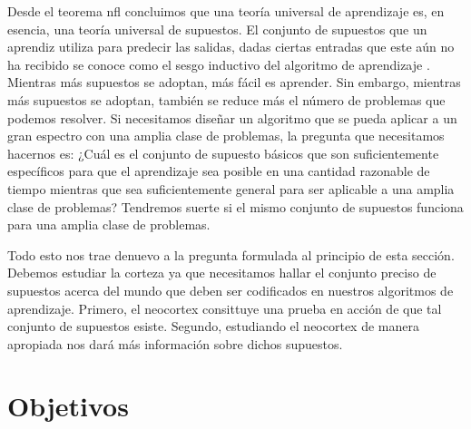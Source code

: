 Desde el teorema \gls{nfl} concluimos que una teoría universal de aprendizaje es,
en esencia, una teoría universal de supuestos.
El conjunto de supuestos que un aprendiz utiliza para predecir las salidas, dadas ciertas entradas
que este aún no ha recibido se conoce como el sesgo inductivo del algoritmo de aprendizaje \cite{Mitchell80theneed,10.1007/BF00993472}.
Mientras más supuestos se adoptan, más fácil es aprender.
Sin embargo, mientras más supuestos se adoptan, también se reduce más el número de problemas que podemos resolver.
Si necesitamos diseñar un algoritmo que se pueda aplicar a un gran espectro con una amplia clase de problemas,
la pregunta que necesitamos hacernos es:
¿Cuál es el conjunto de supuesto básicos que son suficientemente específicos para que el aprendizaje sea posible
en una cantidad razonable de tiempo mientras que sea suficientemente general para ser aplicable a una
amplia clase de problemas?
Tendremos suerte si el mismo conjunto de supuestos funciona para una amplia clase de problemas.

Todo esto nos trae denuevo a la pregunta formulada al principio de esta sección.
Debemos estudiar la corteza ya que necesitamos hallar el conjunto preciso de supuestos
acerca del mundo que deben ser codificados en nuestros algoritmos de aprendizaje.
Primero, el neocortex consittuye una prueba en acción de que tal conjunto de supuestos esiste.
Segundo, estudiando el neocortex de manera apropiada nos dará más información sobre dichos supuestos.





















\section{Objetivos}














































